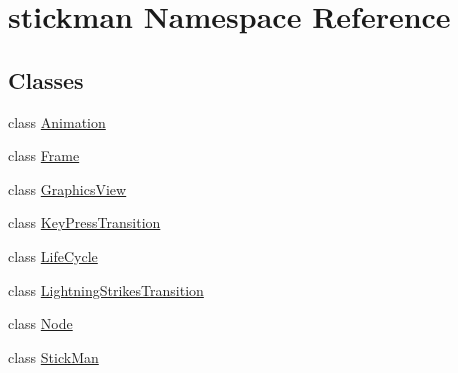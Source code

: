\hypertarget{namespacestickman}{}\section{stickman Namespace Reference}
\label{namespacestickman}
\subsection*{Classes}
\begin{DoxyCompactItemize}
\item 
class \hyperlink{classstickman_1_1Animation}{Animation}
\item 
class \hyperlink{classstickman_1_1Frame}{Frame}
\item 
class \hyperlink{classstickman_1_1GraphicsView}{Graphics\+View}
\item 
class \hyperlink{classstickman_1_1KeyPressTransition}{Key\+Press\+Transition}
\item 
class \hyperlink{classstickman_1_1LifeCycle}{Life\+Cycle}
\item 
class \hyperlink{classstickman_1_1LightningStrikesTransition}{Lightning\+Strikes\+Transition}
\item 
class \hyperlink{classstickman_1_1Node}{Node}
\item 
class \hyperlink{classstickman_1_1StickMan}{Stick\+Man}
\end{DoxyCompactItemize}

